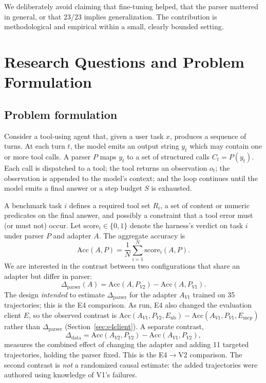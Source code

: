 \documentclass[10pt,twocolumn]{article}
\begin{document}
We deliberately avoid claiming that fine-tuning helped, that the parser mattered in general, or that 23/23 implies generalization. The contribution is methodological and empirical within a small, clearly bounded setting.

\section{Research Questions and Problem Formulation}

\subsection{Problem formulation}

Consider a tool-using agent that, given a user task $x$, produces a sequence of turns. At each turn $t$, the model emits an output string $y_t$ which may contain one or more tool calls. A parser $P$ maps $y_t$ to a set of structured calls $C_t = P(y_t)$. Each call is dispatched to a tool; the tool returns an observation $o_t$; the observation is appended to the model's context; and the loop continues until the model emits a final answer or a step budget $S$ is exhausted.

A benchmark task $i$ defines a required tool set $R_i$, a set of content or numeric predicates on the final answer, and possibly a constraint that a tool error must (or must not) occur. Let $\mathrm{score}_i \in \{0,1\}$ denote the harness's verdict on task $i$ under parser $P$ and adapter $A$. The aggregate accuracy is
\begin{equation}
\mathrm{Acc}(A, P) = \frac{1}{N}\sum_{i=1}^{N}\mathrm{score}_i(A,P).
\end{equation}
We are interested in the contrast between two configurations that share an adapter but differ in parser:
\begin{equation}
\Delta_{\mathrm{parser}}(A) = \mathrm{Acc}(A, P_{V2}) - \mathrm{Acc}(A, P_{V1}).
\end{equation}
The design \emph{intended} to estimate $\Delta_{\mathrm{parser}}$ for the adapter $A_{V1}$ trained on 35 trajectories; this is the E4 comparison. As run, E4 also changed the evaluation client $E$, so the observed contrast is $\mathrm{Acc}(A_{V1}, P_{V2}, E_{\mathrm{nb}}) - \mathrm{Acc}(A_{V1}, P_{V1}, E_{\mathrm{mcp}})$ rather than $\Delta_{\mathrm{parser}}$ (Section~\ref{sec:e4client}). A separate contrast,
\begin{equation}
\Delta_{\mathrm{data}} = \mathrm{Acc}(A_{V2}, P_{V2}) - \mathrm{Acc}(A_{V1}, P_{V2}),
\end{equation}
measures the combined effect of changing the adapter and adding 11 targeted trajectories, holding the parser fixed. This is the E4$\to$V2 comparison. The second contrast is \emph{not} a randomized causal estimate: the added trajectories were authored using knowledge of V1's failures.
\end{document}
